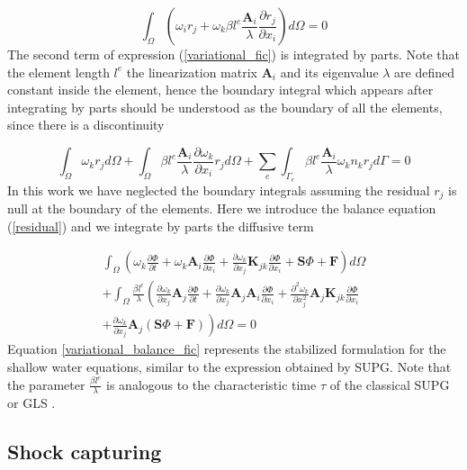 \documentclass[a4paper,12pt]{article}
\newcommand{\pder}[2]{\frac{\partial#1}{\partial#2}}
\newcommand{\ppder}[2]{\frac{\partial^2#1}{\partial#2^2}}
\begin{document}
\begin{equation} \label{variational_fic}
\int_\Omega \left(
    \omega_i r_j + \omega_k \beta l^e\frac{\mathbf{A}_i}{\lambda}\pder{r_j}{x_i}
\right) d\Omega = 0
\end{equation}
The second term of expression (\ref{variational_fic}) is integrated by parts. Note that the element length $l^e$ the linearization matrix $\mathbf{A}_i$ and its eigenvalue $\lambda$ are defined constant inside the element, hence the boundary integral which appears after integrating by parts should be understood as the boundary of all the elements, since there is a discontinuity

\begin{equation} \label{variational_fic_parts}
\int_\Omega \omega_k r_j d\Omega
+ \int_\Omega \beta l^e\frac{\mathbf{A}_i}{\lambda}\pder{\omega_k}{x_i} r_j d\Omega
+ \sum_e \int_{\Gamma_e} \beta l^e\frac{\mathbf{A}_i}{\lambda}\omega_kn_kr_j d\Gamma = 0
\end{equation}
In this work we have neglected the boundary integrals assuming the residual $r_j$ is null at the boundary of the elements. Here we introduce the balance equation (\ref{residual}) and we integrate by parts the diffusive term

\begin{multline} \label{variational_balance_fic}
\int_\Omega \left(
    \omega_k \pder{\Phi}{t} + \omega_k \mathbf{A}_i\pder{\Phi}{x_i}
    + \pder{\omega_k}{x_j} \mathbf{K}_{jk} \pder{\Phi}{x_i} + \mathbf{S}\Phi + \mathbf{F}
\right) d\Omega\\ +
\int_\Omega \frac{\beta l^e}{\lambda} \left(
    \pder{\omega_k}{x_j} \mathbf{A}_j \pder{\Phi}{t}
    + \pder{\omega_k}{x_j} \mathbf{A}_j\mathbf{A}_i\pder{\Phi}{x_i}
    + \ppder{\omega_k}{x_j} \mathbf{A}_j\mathbf{K}_{jk} \pder{\Phi}{x_i} \right. \\
    \left.
    + \pder{\omega_k}{x_j} \mathbf{A}_j(\mathbf{S}\Phi + \mathbf{F})
\right) d\Omega
=0
\end{multline}
Equation \ref{variational_balance_fic} represents the stabilized formulation for the shallow water equations, similar to the expression obtained by SUPG. Note that the parameter $\frac{\beta l^e}{\lambda}$ is analogous to the characteristic time $\tau$ of the classical SUPG or GLS \cite{cotela2016}.


\subsection{Shock capturing}
\end{document}
